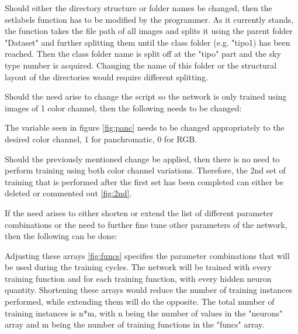 
Should either the directory structure or folder names be changed, then the setlabels function has to be modified by the programmer. As it currently stands, the function takes the file path of all images and splits it using the parent folder "Dataset" and further splitting them until the class folder (e.g. "tipo1) has been reached. Then the class folder name is split off at the "tipo" part and the sky type number is acquired. Changing the name of this folder or the structural layout of the directories would require different splitting.

Should the need arise to change the script so the network is only trained using images of 1 color channel, then the following needs to be changed:


The variable seen in figure \ref{fig:panc} needs to be changed appropriately to the desired color channel, 1 for panchromatic, 0 for RGB.


Should the previously mentioned change be applied, then there is no need to perform training using both color channel variations. Therefore, the 2nd set of training that is performed after the first set has been completed can either be deleted or commented out \ref{fig:2nd}.

If the need arises to either shorten or extend the list of different parameter combinations or the need to further fine tune other parameters of the network, then the following can be done:


Adjusting these arrays \ref{fig:funcs} specifies the parameter combinations that will be used during the training cycles. The network will be trained with every training function and for each training function, with every hidden neuron quantity. Shortening these arrays would reduce the number of training instances performed, while extending them will do the opposite. The total number of training instances is n*m, with n being the number of values in the "neurons" array and m being the number of training functions in the "funcs" array.

